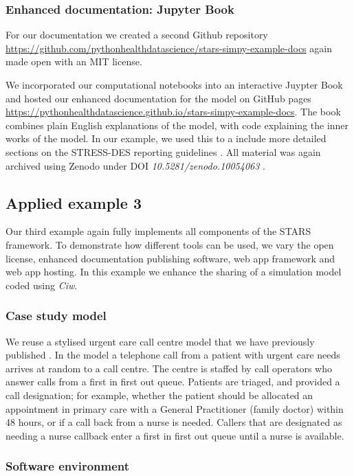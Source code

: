 \documentclass[]{interact}
\theoremstyle{plain}%
\theoremstyle{definition}
\theoremstyle{remark}
\begin{document}
\subsubsection{Enhanced documentation: Jupyter Book}

For our documentation we created a second Github repository \url{https://github.com/pythonhealthdatascience/stars-simpy-example-docs} again made open with an MIT license. 

We incorporated our computational notebooks into an interactive Juypter Book and hosted our enhanced documentation for the model on GitHub pages \url{https://pythonhealthdatascience.github.io/stars-simpy-example-docs}.  The book combines plain English explanations of the model, with code explaining the inner works of the model.  In our example, we used this to a include more detailed sections on the STRESS-DES reporting guidelines \citep{monks2019strengthening}.  All material was again archived using Zenodo under DOI \textit{10.5281/zenodo.10054063} \citep{applied_example2_docs}. 

\subsection{Applied example 3}

Our third example again fully implements all components of the STARS framework. To demonstrate how different tools can be used, we vary the open license, enhanced documentation publishing software, web app framework and web app hosting.  In this example we enhance the sharing of a simulation model coded using \textit{Ciw}.

\subsubsection{Case study model}
We reuse a stylised urgent care call centre model that we have previously published \cite{monks2023improving}. In the model a telephone call from a patient with urgent care needs arrives at random to a call centre. The centre is staffed by call operators who answer calls from a first in first out queue. Patients are triaged, and provided a call designation; for example, whether the patient should be allocated an appointment in primary care with a General Practitioner (family doctor) within 48 hours, or if a call back from a nurse is needed.  Callers that are designated as needing a nurse callback enter a first in first out queue until a nurse is available.  

\subsubsection{Software environment}
\end{document}
